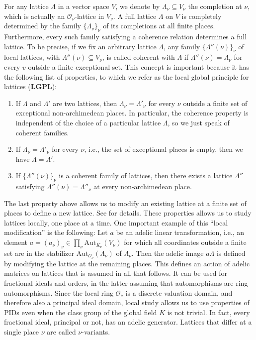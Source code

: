 \documentclass{article}
\theoremstyle{definition}
\theoremstyle{remark}
\begin{document}
For any lattice $\Lambda$ in a vector space $V$, we denote
by $\Lambda_{\nu}\subseteq V_{\nu}$ the completion at $\nu$, which is actually
an $\mathcal{O}_{\nu}$-lattice in $V_{\nu}$. A full lattice $\Lambda$ on $V$
is completely determined by the family $\{\Lambda_{\nu}\}_{\nu}$ of
its completions at all finite places. Furthermore, every
such family satisfying a coherence relation determines 
a full lattice.
To be precise, if we fix an arbitrary lattice $\Lambda$, 
any family
$\{\Lambda''(\nu)\}_{\nu}$ of local lattices, with 
$\Lambda''(\nu)\subseteq V_{\nu}$, is called coherent 
with $\Lambda$ if
$\Lambda''(\nu)=\Lambda_{\nu}$ for every $v$ outside a finite 
exceptional set.  This concept is important because
it has the following list of properties, to which we refer
as the local global principle for lattices (\textbf{LGPL}):
\begin{enumerate}[label=($\clubsuit$\bf{\arabic*})]
\item\label{it1}
If $\Lambda$ and $\Lambda'$ are two lattices, then
    $\Lambda_{\nu}=\Lambda'_{\nu}$ for every $\nu$ outside 
    a finite set of exceptional non-archimedean places.
    In particular, the coherence property is independent of the
    choice of a particular lattice $\Lambda$, so we just speak of 
    coherent families.
\item\label{it2}
If $\Lambda_{\nu}=\Lambda'_{\nu}$ for every $\nu$, 
 i.e., the set of 
 exceptional places is empty, then we have $\Lambda=\Lambda'$.
\item \label{it3}
If $\{\Lambda''(\nu)\}_{\nu}$ is a coherent family of lattices,
 then there exists a lattice $\Lambda''$ satisfying
 $\Lambda''(\nu)=\Lambda''_{\nu}$ at every non-archimedean place.
\end{enumerate}
The last property above allows us to modify an existing lattice
at a finite set of places to define a new lattice. 
See \cite[\S81:14]{O73} for details.
These properties allows us to study lattices locally, one place at a time.
One important example of this ``local modification'' is the following:
Let $a$ be an adelic linear transformation, i.e., an element
$a=(a_\nu)_\nu\in\prod_\nu\mathrm{Aut}_{K_\nu}(V_\nu)$
for which all coordinates outside a finite set are
in the stabilizer $\mathrm{Aut}_{\mathcal{O}_\nu}(\Lambda_\nu)$
of $\Lambda_\nu$. Then the adelic image $a\Lambda$
is defined by modifying the lattice at the remaining places.
This defines an action of adelic matrices on lattices
that is assumed in all that follows.
It can be used for fractional ideals and orders,
in the latter assuming that automorphisms are ring automorphisms.
Since the local ring $\mathcal{O}_{\nu}$ is a discrete valuation domain,
and therefore also a principal ideal domain, local study allows us to use
properties of PIDs even when the class group of the global field
$K$ is not trivial. In fact, every fractional ideal, principal or not,
has an adelic generator.
Lattices that differ at a single place $\nu$
are called $\nu$-variants.
\end{document}
